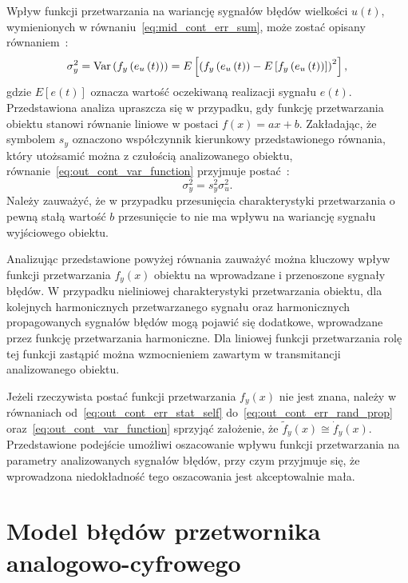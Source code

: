 Wpływ funkcji przetwarzania na wariancję sygnałów błędów wielkości $u(t)$, wymienionych w równaniu~\eqref{eq:mid_cont_err_sum}, może zostać opisany równaniem~\cite{oppenheim_sns}:
\begin{equation}
\sigma_{y}^{2} = \text{Var}\left(f_{y} \left(e_{u} \left(t\right)\right)\right) = E \left[ \left( f_{y} \left(e_{u} \left(t\right)\right) - E \left[ f_{y} \left(e_{u} \left(t\right)\right) \right] \right)^2 \right] \label{eq:out_cont_var_function},
\end{equation}
gdzie $E[e(t)]$ oznacza wartość oczekiwaną realizacji sygnału $e(t)$. Przedstawiona analiza upraszcza się w przypadku, gdy funkcję przetwarzania obiektu stanowi równanie liniowe w postaci $f(x) = ax + b$. Zakładając, że symbolem $s_{y}$ oznaczono współczynnik kierunkowy przedstawionego równania, który utożsamić można z czułością analizowanego obiektu, równanie~\eqref{eq:out_cont_var_function} przyjmuje postać~\cite{oppenheim_sns}:
\begin{equation}
\sigma_{y}^{2} = s_{y}^{2} \sigma_{u}^{2} \label{eq:out_cont_var_sense}.
\end{equation}
Należy zauważyć, że w przypadku przesunięcia charakterystyki przetwarzania o pewną stałą wartość $b$ przesunięcie to nie ma wpływu na wariancję sygnału wyjściowego obiektu.

Analizując przedstawione powyżej równania zauważyć można kluczowy wpływ funkcji przetwarzania $f_{y}(x)$ obiektu na wprowadzane i przenoszone sygnały błędów. W przypadku nieliniowej charakterystyki przetwarzania obiektu, dla kolejnych harmonicznych przetwarzanego sygnału oraz harmonicznych propagowanych sygnałów błędów mogą pojawić się dodatkowe, wprowadzane przez funkcję przetwarzania harmoniczne. Dla liniowej funkcji przetwarzania rolę tej funkcji zastąpić można wzmocnieniem zawartym w transmitancji analizowanego obiektu.

Jeżeli rzeczywista postać funkcji przetwarzania $f_{y}(x)$ nie jest znana, należy w równaniach od~\eqref{eq:out_cont_err_stat_self} do~\eqref{eq:out_cont_err_rand_prop} oraz~\eqref{eq:out_cont_var_function} sprzyjąć założenie, że $\tilde{f}_{y}(x) \cong \dot{f}_{y}(x)$. Przedstawione podejście umożliwi oszacowanie wpływu funkcji przetwarzania na parametry analizowanych sygnałów błędów, przy czym przyjmuje się, że wprowadzona niedokładność tego oszacowania jest akceptowalnie mała.

\section{Model błędów przetwornika analogowo-cyfrowego}

